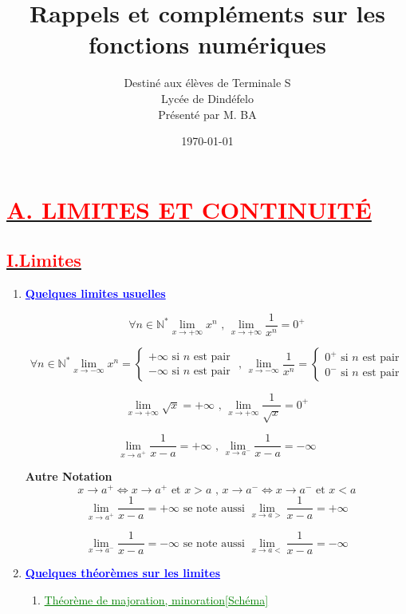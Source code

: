 \documentclass[12pt]{article}
\author{Destiné aux élèves de Terminale S\\Lycée de Dindéfelo\\Présenté par M. BA}
\title{\textbf{Rappels et compléments sur les fonctions numériques}}
\date{\today}
\begin{document}
\maketitle
\section*{\underline{\textbf{\textcolor{red}{A. LIMITES ET CONTINUITÉ}}}}
\subsection*{\underline{\textbf{\textcolor{red}{I.Limites}}}}

\renewcommand{\labelenumi}{\theenumi)}
\begin{enumerate}[label=\arabic*)]
    \item \textbf{\textcolor{blue}{\underline{Quelques limites usuelles}}}
    
\[\forall n\in\mathbb{N}^{*} \lim_{x \to +\infty} x^{n} \text{ , } \lim_{x \to +\infty} \frac{1}{x^{n}}=0^{+}  \]

\[ \forall n\in\mathbb{N}^{*}
 \lim_{x \to -\infty} x^{n} =
 \begin{cases} 
 +\infty \text{ si \(n\) est pair}\\
 -\infty \text{ si \(n\) est pair}
 \end{cases}
\text{ , }
\lim_{x \to -\infty} \frac{1}{x^{n}}=
 \begin{cases} 
 0^{+} \text{ si \(n\) est pair}\\
 0^{-} \text{ si \(n\) est pair}
 \end{cases}
\]

\[ \lim_{x \to +\infty} \sqrt{x}=+\infty \text{ , } \lim_{x \to +\infty} \frac{1}{\sqrt{x}}=0^{+}  \]

\[ \lim_{x \to a^{+}} \frac{1}{x-a}=+\infty \text{ , } \lim_{x \to a^{-}} \frac{1}{x-a}=-\infty  \]

		\textbf{Autre Notation}
\[x\rightarrow a^{+} \Leftrightarrow x\rightarrow a^{+} \text{ et } x > a \text{ , } x\rightarrow a^{-} \Leftrightarrow x\rightarrow a^{-} \text{ et } x < a \]
\[ \lim_{x \to a^{+}} \frac{1}{x-a}=+\infty \text{ se note aussi } \lim_{x \to a>} \frac{1}{x-a}=+\infty  \]	

\[ \lim_{x \to a^{-}} \frac{1}{x-a}=-\infty \text{ se note aussi } \lim_{x \to a<} \frac{1}{x-a}=-\infty  \]	
    
    \item	\textbf{\textcolor{blue}{\underline{Quelques théorèmes sur les limites}}}
\begin{enumerate}[label=\alph*)]
       \item \textcolor{green}{\underline{Théorème de majoration, minoration[Schéma]}}
       

\end{enumerate}
\end{enumerate}
\end{document}
